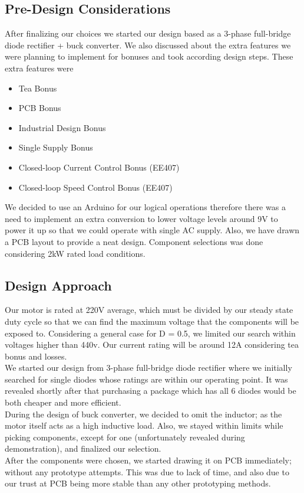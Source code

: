 \documentclass[12pt]{article}
\begin{document}
\subsection{Pre-Design Considerations}
After finalizing our choices we started our design based as a 3-phase full-bridge diode rectifier + buck converter. We also discussed about the extra features we were planning to implement for bonuses and took according design steps. These extra features were
\begin{itemize}
    \item Tea Bonus
    \item PCB Bonus
    \item Industrial Design Bonus
    \item Single Supply Bonus
    \item Closed-loop Current Control Bonus (EE407)
    \item Closed-loop Speed Control Bonus (EE407)
\end{itemize}
We decided to use an Arduino for our logical operations therefore there was a need to implement an extra conversion to lower voltage levels around 9V to power it up so that we could operate with single AC supply. Also, we have drawn a PCB layout to provide a neat design. Component selections was done considering 2kW rated load conditions.
\subsection{Design Approach}
Our motor is rated at 220V average, which must be divided by our steady state duty cycle so that we can find the maximum voltage that the components will be exposed to. Considering a general case for D = 0.5, we limited our search within voltages higher than 440v. Our current rating will be around 12A considering tea bonus and losses. \smallskip \\
We started our design from 3-phase full-bridge diode rectifier where we initially searched for single diodes whose ratings are within our operating point. It was revealed shortly after that purchasing a package which has all 6 diodes would be both cheaper and more efficient. \smallskip \\
During the design of buck converter, we decided to omit the inductor; as the motor itself acts as a high inductive load. Also, we stayed within limits while picking components, except for one (unfortunately revealed during demonstration), and finalized our selection. \smallskip \\
After the components were chosen, we started drawing it on PCB immediately; without any prototype attempts. This was due to lack of time, and also due to our trust at PCB being more stable than any other prototyping methods.
\end{document}

